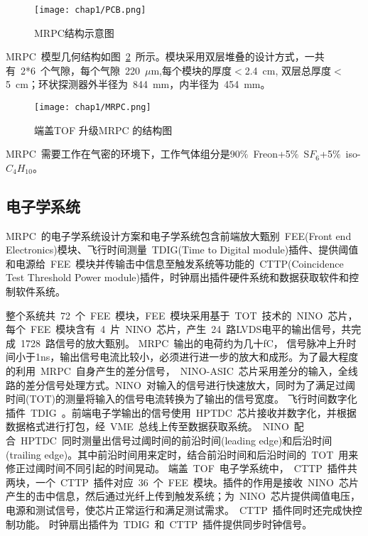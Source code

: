\begin{figure}[!h]
  \centering
  \texttt{[image: chap1/PCB.png]}
  \caption{MRPC结构示意图}
  \label{fig:PCB}
\end{figure}

MRPC~模型几何结构如图~\ref{fig:MRPC}~所示。模块采用双层堆叠的设计方式，一共有~2*6~个气隙，每个气隙~220~$\mu$m,每个模块的厚度$<$2.4~cm, 双层总厚度$<$5~cm；环状探测器外半径为~844~mm，内半径为~454~mm。
\begin{figure}[!h]
  \centering
  \texttt{[image: chap1/MRPC.png]}
  \caption{端盖TOF 升级MRPC 的结构图}
  \label{fig:MRPC}
\end{figure}

MRPC~需要工作在气密的环境下，工作气体组分是90$\%$~Freon+5$\%$~S$F_{6}$+5$\%$~iso-$C_{4}H_{10}$。
\subsection{电子学系统}

MRPC~的电子学系统设计方案和电子学系统包含前端放大甄别~FEE(Front end Electronics)模块、飞行时间测量~TDIG(Time to Digital module)插件、提供阈值和电源给~FEE~模块并传输击中信息至触发系统等功能的~CTTP(Coincidence Test Threshold Power module)插件，时钟扇出插件硬件系统和数据获取软件和控制软件系统。

整个系统共~72~个~FEE~模块，FEE~模块采用基于~TOT~技术的~NINO~芯片，每个~FEE~模块含有~4~片~NINO~芯片，产生~24~路LVDS电平的输出信号，共完成~1728~路信号的放大甄别。
MRPC~输出的电荷约为几十fC， 信号脉冲上升时间小于1ns，输出信号电流比较小，必须进行进一步的放大和成形。为了最大程度的利用~MRPC~自身产生的差分信号，~NINO-ASIC~芯片采用差分的输入，全线路的差分信号处理方式。NINO~对输入的信号进行快速放大，同时为了满足过阈时间(TOT)的测量将输入的信号电流转换为了输出的信号宽度。
飞行时间数字化插件~TDIG~。前端电子学输出的信号使用~HPTDC~芯片接收并数字化，并根据数据格式进行打包，经~VME~总线上传至数据获取系统。~NINO~配合~HPTDC~同时测量出信号过阈时间的前沿时间(leading edge)和后沿时间(trailing edge)。其中前沿时间用来定时，结合前沿时间和后沿时间的~TOT~用来修正过阈时间不同引起的时间晃动。
端盖~TOF~电子学系统中，~CTTP~插件共两块，一个~CTTP~插件对应~36~个~FEE~模块。插件的作用是接收~NINO~芯片产生的击中信息，然后通过光纤上传到触发系统；为~NINO~芯片提供阈值电压，电源和测试信号，使芯片正常运行和满足测试需求。~CTTP~插件同时还完成快控制功能。
时钟扇出插件为~TDIG~和~CTTP~插件提供同步时钟信号。

